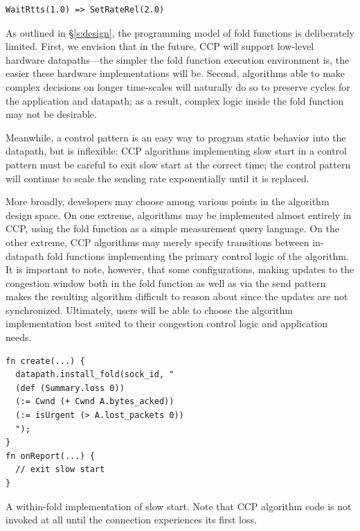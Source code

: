 \begin{verbatim}
WaitRtts(1.0) => SetRateRel(2.0)
\end{verbatim}

As outlined in \S\ref{s:design}, the programming model of fold functions is deliberately limited.
First, we envision that in the future, CCP will support low-level hardware datapaths---the simpler the fold function execution environment is, the easier these hardware implementations will be. Second, algorithms able to make complex decisions on longer time-scales will naturally do so to preserve cycles for the application and datapath; as a result, complex logic inside the fold function may not be desirable.

Meanwhile, a control pattern is an easy way to program static behavior into the datapath, but is inflexible: CCP algorithms implementing slow start in a control pattern must be careful to exit slow start at the correct time; the control pattern will continue to scale the sending rate exponentially until it is replaced.

\smallskip

More broadly, developers may choose among various points in the algorithm design space. 
On one extreme, algorithms may be implemented almost entirely in CCP, using the fold function as a simple measurement query language.
On the other extreme, CCP algorithms may merely specify transitions between in-datapath fold functions implementing the primary control logic of the algorithm.
It is important to note, however, that some configurations, \eg making updates to the congestion window both in the fold function as well as via the send pattern makes the resulting algorithm difficult to reason about since the updates are not synchronized.
Ultimately, users will be able to choose the algorithm implementation best suited to their congestion control logic and application needs.

\begin{listing}[t]
{\footnotesize
\begin{verbatim}
fn create(...) {
  datapath.install_fold(sock_id, "
  (def (Summary.loss 0))
  (:= Cwnd (+ Cwnd A.bytes_acked))
  (:= isUrgent (> A.lost_packets 0))
  ");
}
fn onReport(...) {
  // exit slow start
}
\end{verbatim}
}
\caption{A within-fold implementation of slow start. Note that CCP algorithm code is not invoked at all until the connection experiences its first loss.} \label{lst:ccp:ssfold}
\end{listing}